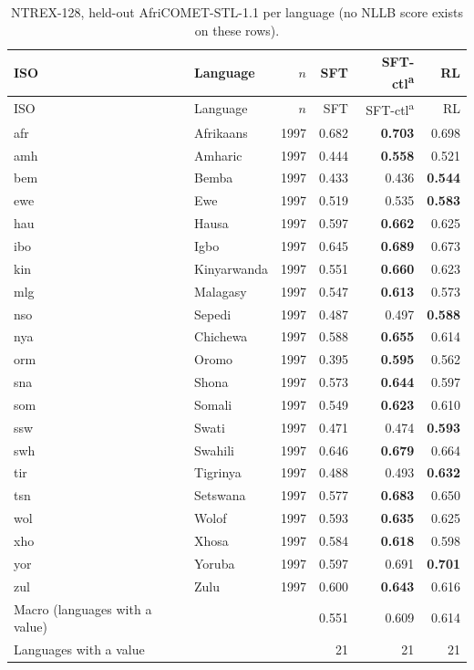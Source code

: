 {\footnotesize\setlength{\tabcolsep}{3pt}
\begin{longtable}{@{}llrrrr@{}}
\caption{NTREX-128, held-out AfriCOMET-STL-1.1 per language (no NLLB score exists on these rows).}\label{tab:full-ntrex-comet}\\
\toprule
ISO & Language & $n$ & SFT & SFT-ctl\textsuperscript{a} & RL \\
\midrule\endfirsthead
\toprule
ISO & Language & $n$ & SFT & SFT-ctl\textsuperscript{a} & RL \\
\midrule\endhead
\midrule\endfoot
\bottomrule\endlastfoot
afr & Afrikaans & 1997 & 0.682 & \textbf{0.703} & 0.698 \\
amh & Amharic & 1997 & 0.444 & \textbf{0.558} & 0.521 \\
bem & Bemba & 1997 & 0.433 & 0.436 & \textbf{0.544} \\
ewe & Ewe & 1997 & 0.519 & 0.535 & \textbf{0.583} \\
hau & Hausa & 1997 & 0.597 & \textbf{0.662} & 0.625 \\
ibo & Igbo & 1997 & 0.645 & \textbf{0.689} & 0.673 \\
kin & Kinyarwanda & 1997 & 0.551 & \textbf{0.660} & 0.623 \\
mlg & Malagasy & 1997 & 0.547 & \textbf{0.613} & 0.573 \\
nso & Sepedi & 1997 & 0.487 & 0.497 & \textbf{0.588} \\
nya & Chichewa & 1997 & 0.588 & \textbf{0.655} & 0.614 \\
orm & Oromo & 1997 & 0.395 & \textbf{0.595} & 0.562 \\
sna & Shona & 1997 & 0.573 & \textbf{0.644} & 0.597 \\
som & Somali & 1997 & 0.549 & \textbf{0.623} & 0.610 \\
ssw & Swati & 1997 & 0.471 & 0.474 & \textbf{0.593} \\
swh & Swahili & 1997 & 0.646 & \textbf{0.679} & 0.664 \\
tir & Tigrinya & 1997 & 0.488 & 0.493 & \textbf{0.632} \\
tsn & Setswana & 1997 & 0.577 & \textbf{0.683} & 0.650 \\
wol & Wolof & 1997 & 0.593 & \textbf{0.635} & 0.625 \\
xho & Xhosa & 1997 & 0.584 & \textbf{0.618} & 0.598 \\
yor & Yoruba & 1997 & 0.597 & 0.691 & \textbf{0.701} \\
zul & Zulu & 1997 & 0.600 & \textbf{0.643} & 0.616 \\
\midrule
Macro (languages with a value) & & & 0.551 & 0.609 & 0.614 \\
Languages with a value & & & 21 & 21 & 21 \\
\end{longtable}}

